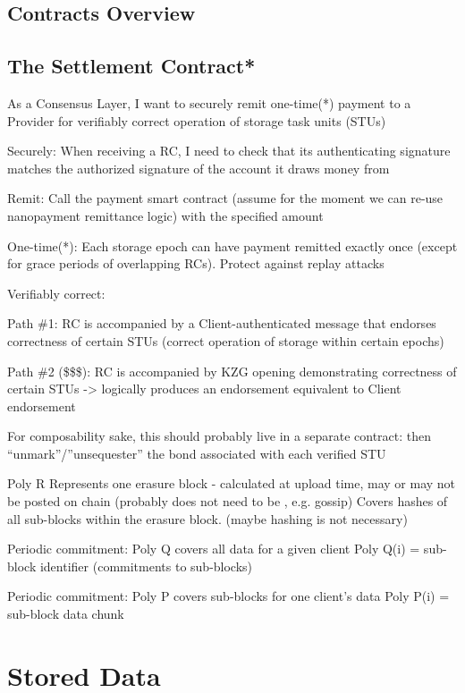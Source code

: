 \documentclass{article}
\begin{document}
\subsection{Contracts Overview}
\subsection{The Settlement Contract*}

As a Consensus Layer, I want to securely remit one-time(*) payment to a Provider for verifiably correct operation of storage task units (STUs)

Securely: When receiving a RC, I need to check that its authenticating signature matches the authorized signature of the account it draws money from

Remit: Call the payment smart contract (assume for the moment we can re-use nanopayment remittance logic) with the specified amount

One-time(*): Each storage epoch can have payment remitted exactly once (except for grace periods of overlapping RCs). Protect against replay attacks

Verifiably correct:

  Path \#1: RC is accompanied by a Client-authenticated message that endorses correctness of certain STUs (correct operation of storage within certain epochs)
  
  Path \#2 (\$\$\$): RC is accompanied by KZG opening demonstrating correctness of certain STUs -> logically produces an endorsement equivalent to Client endorsement

For composability sake, this should probably live in a separate contract: then “unmark”/”unsequester” the bond associated with each verified STU



Poly R
Represents one erasure block - calculated at upload time, may or may not be posted on chain (probably does not need to be , e.g. gossip)
Covers hashes of all sub-blocks within the erasure block. (maybe hashing is not necessary)

Periodic commitment:
Poly Q covers all data for a given client
Poly Q(i) = sub-block identifier (commitments to sub-blocks)

Periodic commitment:
Poly P covers sub-blocks for one client’s data
Poly P(i) = sub-block data chunk

\section{Stored Data} \label{Stored Data}
\end{document}
